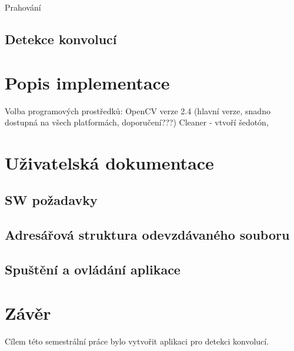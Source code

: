 \documentclass[12pt, a4paper]{report}
\begin{document}
	Prahování
	\section{Detekce konvolucí}


\chapter{Popis implementace}
Volba programových prostředků: OpenCV verze 2.4 (hlavní verze, snadno dostupná na všech platformách, doporučení???)
	Cleaner - vtvoří šedotón, 

\chapter{Uživatelská dokumentace}
	\section{SW požadavky}
	
	\section{Adresářová struktura odevzdávaného souboru}	
	
	\section{Spuštění a ovládání aplikace}	

\chapter{Závěr}
Cílem této semestrální práce bylo vytvořit aplikaci pro detekci konvolucí.
\end{document}
